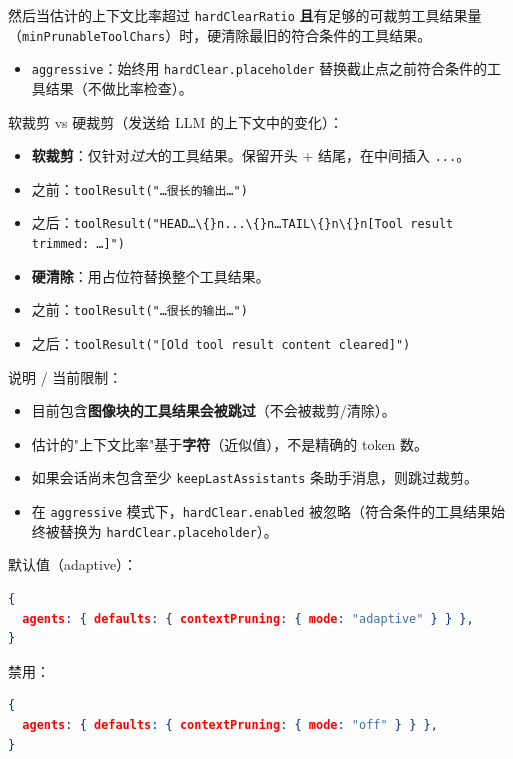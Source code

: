 然后当估计的上下文比率超过 \texttt{hardClearRatio} \textbf{且}有足够的可裁剪工具结果量（\texttt{minPrunableToolChars}）时，硬清除最旧的符合条件的工具结果。
\begin{itemize}
  \item \texttt{aggressive}：始终用 \texttt{hardClear.placeholder} 替换截止点之前符合条件的工具结果（不做比率检查）。
\end{itemize}


软裁剪 vs 硬裁剪（发送给 LLM 的上下文中的变化）：

\begin{itemize}
  \item \textbf{软裁剪}：仅针对\textit{过大}的工具结果。保留开头 + 结尾，在中间插入 \texttt{...}。
  \item 之前：\texttt{toolResult("…很长的输出…")}
  \item 之后：\texttt{toolResult("HEAD…\textbackslash\{\}n...\textbackslash\{\}n…TAIL\textbackslash\{\}n\textbackslash\{\}n[Tool result trimmed: …]")}
  \item \textbf{硬清除}：用占位符替换整个工具结果。
  \item 之前：\texttt{toolResult("…很长的输出…")}
  \item 之后：\texttt{toolResult("[Old tool result content cleared]")}
\end{itemize}


说明 / 当前限制：

\begin{itemize}
  \item 目前包含\textbf{图像块的工具结果会被跳过}（不会被裁剪/清除）。
  \item 估计的"上下文比率"基于\textbf{字符}（近似值），不是精确的 token 数。
  \item 如果会话尚未包含至少 \texttt{keepLastAssistants} 条助手消息，则跳过裁剪。
  \item 在 \texttt{aggressive} 模式下，\texttt{hardClear.enabled} 被忽略（符合条件的工具结果始终被替换为 \texttt{hardClear.placeholder}）。
\end{itemize}


默认值（adaptive）：

\begin{lstlisting}[language=json]
{
  agents: { defaults: { contextPruning: { mode: "adaptive" } } },
}
\end{lstlisting}


禁用：

\begin{lstlisting}[language=json]
{
  agents: { defaults: { contextPruning: { mode: "off" } } },
}
\end{lstlisting}


